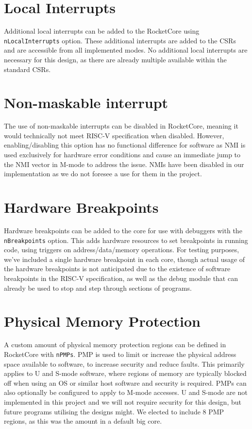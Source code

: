 \section{Local Interrupts}
Additional local interrupts can be added to the RocketCore using \texttt{nLocalInterrupts} option. These additional interrupts are added to the CSRs and are accessible from all implemented modes. No additional local interrupts are necessary for this design, as there are already multiple available within the standard CSRs.

\section{Non-maskable interrupt}
The use of non-maskable interrupts can be disabled in RocketCore, meaning it would technically not meet RISC-V specification when disabled. However, enabling/disabling this option has no functional difference for software as NMI is used exclusively for hardware error conditions and cause an immediate jump to the NMI vector in M-mode to address the issue. NMIs have been disabled in our implementation as we do not foresee a use for them in the project.

\section{Hardware Breakpoints}
Hardware breakpoints can be added to the core for use with debuggers with the \texttt{nBreakpoints} option. This adds hardware resources to set breakpoints in running code, using triggers on address/data/memory operations. For testing purposes, we've included a single hardware breakpoint in each core, though actual usage of the hardware breakpoints is not anticipated due to the existence of software breakpoints in the RISC-V specification, as well as the debug module that can already be used to stop and step through sections of programs.

\section{Physical Memory Protection}
A custom amount of physical memory protection regions can be defined in RocketCore with \texttt{nPMPs}. PMP is used to limit or increase the physical address space available to software, to increase security and reduce faults. This primarily applies to U and S-mode software, where regions of memory are typically blocked off when using an OS or similar host software and security is required. PMPs can also optionally be configured to apply to M-mode accesses. U and S-mode are not implemented in this project and we will not require security for this design, but future programs utilising the designs might. We elected to include 8 PMP regions, as this was the amount in a default big core.

